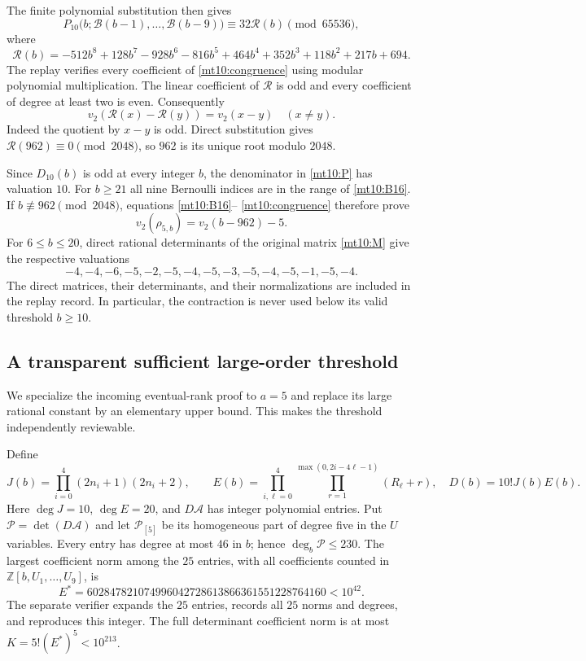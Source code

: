 \documentclass[11pt,a4paper]{article}
\numberwithin{equation}{section}
\theoremstyle{definition}
\theoremstyle{remark}
\begin{document}
The finite polynomial substitution then gives
\begin{equation}\label{mt10:congruence}
 P_{10}\bigl(b;\mathcal B(b-1),\ldots,\mathcal B(b-9)\bigr)
                  \equiv32\mathcal R(b)\pmod {65536},
\end{equation}
where
\[
 \mathcal R(b)=-512b^8+128b^7-928b^6-816b^5+464b^4
                         +352b^3+118b^2+217b+694.
\]
The replay verifies every coefficient of \eqref{mt10:congruence}
using modular polynomial multiplication. The linear coefficient of
$\mathcal R$ is odd and every coefficient of degree at least two
is even. Consequently
\[
 v_2(\mathcal R(x)-\mathcal R(y))=v_2(x-y)\quad(x\ne y).
\]
Indeed the quotient by $x-y$ is odd. Direct substitution gives
$\mathcal R(962)\equiv0\pmod {2048}$, so $962$ is its unique
root modulo $2048$.

Since $D_{10}(b)$ is odd at every integer $b$, the denominator in
\eqref{mt10:P} has valuation $10$. For $b\ge21$ all nine Bernoulli
indices are in the range of \eqref{mt10:B16}. If
$b\not\equiv962\pmod {2048}$, equations \eqref{mt10:B16}--
\eqref{mt10:congruence} therefore prove
\begin{equation}\label{mt10:valuation}
                 v_2(\rho_{5,b})=v_2(b-962)-5.
\end{equation}
For $6\le b\le20$, direct rational determinants of the original
matrix \eqref{mt10:M} give the respective valuations
\[
 -4,-4,-6,-5,-2,-5,-4,-5,-3,-5,-4,-5,-1,-5,-4.
\]
The direct matrices, their determinants, and their normalizations are
included in the replay record. In particular, the contraction is never
used below its valid threshold $b\ge10$.

\subsection{A transparent sufficient large-order threshold}

We specialize the incoming eventual-rank proof to $a=5$ and replace
its large rational constant by an elementary upper bound. This makes
the threshold independently reviewable.

Define
\[
 J(b)=\prod_{i=0}^4(2n_i+1)(2n_i+2),\qquad
 E(b)=\prod_{i,\ell=0}^4
             \prod_{r=1}^{\max(0,2i-4\ell-1)}(R_\ell+r),
 \quad D(b)=10!J(b)E(b).
\]
Here $\deg J=10$, $\deg E=20$, and $D\mathcal A$ has integer
polynomial entries. Put $\mathscr P=\det(D\mathcal A)$ and let
$\mathscr P_{[5]}$ be its homogeneous part of degree five in the
$U$ variables. Every entry has degree at most $46$ in $b$; hence
$\deg_b\mathscr P\le230$. The largest coefficient norm among the
$25$ entries, with all coefficients counted in
$\mathbb Z[b,U_1,\ldots,U_9]$, is
\[
 E^*=602847821074996042728613866361551228764160<10^{42}.
\]
The separate verifier expands the $25$ entries, records all $25$
norms and degrees, and reproduces this integer. The full determinant
coefficient norm is at most $K=5!(E^*)^5<10^{213}$.
\end{document}
